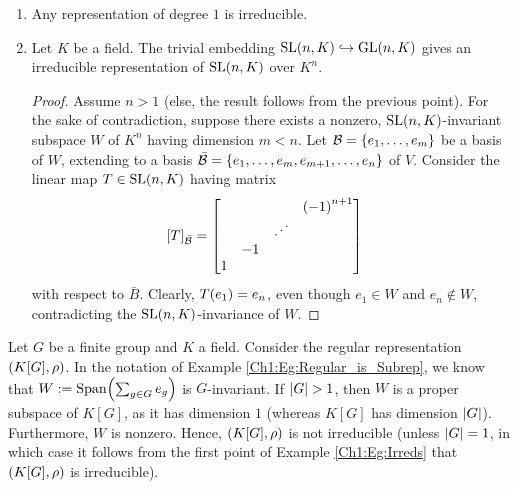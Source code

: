 \begin{boxexample} \label{Ch1:Eg:Irreds}
    \hfill
    \begin{enumerate}
        \item Any representation of degree $1$ is irreducible.
        \item Let $K$ be a field. The trivial embedding $\operatorname{SL}\!\left( n,K \right) \hookrightarrow \operatorname{GL}\!\left( n,K \right)$ gives an irreducible representation of $\operatorname{SL}\!\left( n,K \right)$ over $K^n$.
        \begin{proof}
            Assume $n > 1$ (else, the result follows from the previous point). For the sake of contradiction, suppose there exists a nonzero, $\operatorname{SL}\!\left( n,K \right)$-invariant subspace $W$ of $K^n$ having dimension $m < n$. Let $\mathcal{B} = \left\{ e_1, \ldots, e_m \right\}$ be a basis of $W$, extending to a basis $\bar{\mathcal{B}} = \left\{ e_1, \ldots, e_m, e_{m+1}, \ldots, e_n \right\}$ of $V$. Consider the linear map $T \in \operatorname{SL}\!\left( n,K \right)$ having matrix
            \begin{align*}
                \left[ T \right]_{\bar{\mathcal{B}}} &=
                \begin{bmatrix}
                    & & & \left( -1 \right)^{n+1} \\
                    & & \iddots & \\
                    & -1 & & \\
                    1 & & &
                \end{bmatrix}
            \end{align*}
            with respect to $\bar{B}$. Clearly, $T\!\left( e_1 \right) = e_n$, even though $e_1 \in W$ and $e_n \notin W$, contradicting the $\operatorname{SL}\!\left( n,K \right)$-invariance of $W$.
        \end{proof}
    \end{enumerate}
\end{boxexample}
\begin{boxnexample}
    Let $G$ be a finite group and $K$ a field. Consider the regular representation $\left( K[G], \rho \right)$. In the notation of Example \ref{Ch1:Eg:Regular_is_Subrep}, we know that $W := \operatorname{Span}\!\left( \sum_{g \in G} e_g \right)$ is $G$-invariant. If $\left\lvert G \right\rvert > 1$, then $W$ is a proper subspace of $K[G]$, as it has dimension $1$ (whereas $K[G]$ has dimension $\left\lvert G \right\rvert$). Furthermore, $W$ is nonzero. Hence, $\left( K[G], \rho \right)$ is not irreducible (unless $\left\lvert G \right\rvert = 1$, in which case it follows from the first point of Example \ref{Ch1:Eg:Irreds} that $\left( K[G], \rho \right)$ is irreducible).
\end{boxnexample}
